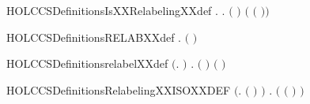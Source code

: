 \newcommand{\HOLCCSDefinitionsISXXPROCXXdef}{\UseVerbatim{HOLCCSDefinitionsISXXPROCXXdef}}
\begin{SaveVerbatim}{HOLCCSDefinitionsIsXXRelabelingXXdef}
\HOLTokenTurnstile{} \HOLSymConst{\HOLTokenForall{}}.   \HOLSymConst{\HOLTokenEquiv{}} \HOLSymConst{\HOLTokenForall{}}.  \ensuremath{(} \ensuremath{)} \HOLSymConst{\ensuremath{=}}  \ensuremath{(} \ensuremath{(} \ensuremath{)}\ensuremath{)}
\end{SaveVerbatim}
\newcommand{\HOLCCSDefinitionsIsXXRelabelingXXdef}{\UseVerbatim{HOLCCSDefinitionsIsXXRelabelingXXdef}}
\begin{SaveVerbatim}{HOLCCSDefinitionsRELABXXdef}
\HOLTokenTurnstile{} \HOLSymConst{\HOLTokenForall{}}.   \HOLSymConst{\ensuremath{=}}  \ensuremath{(} \ensuremath{)}
\end{SaveVerbatim}
\newcommand{\HOLCCSDefinitionsRELABXXdef}{\UseVerbatim{HOLCCSDefinitionsRELABXXdef}}
\begin{SaveVerbatim}{HOLCCSDefinitionsrelabelXXdef}
\HOLTokenTurnstile{} \ensuremath{(}\HOLSymConst{\HOLTokenForall{}}.   \HOLConst{\ensuremath{\tau}} \HOLSymConst{\ensuremath{=}} \HOLConst{\ensuremath{\tau}}\ensuremath{)} \HOLSymConst{\HOLTokenConj{}}
   \HOLSymConst{\HOLTokenForall{}} .   \ensuremath{(} \ensuremath{)} \HOLSymConst{\ensuremath{=}}  \ensuremath{(}  \ensuremath{)}
\end{SaveVerbatim}
\newcommand{\HOLCCSDefinitionsrelabelXXdef}{\UseVerbatim{HOLCCSDefinitionsrelabelXXdef}}
\begin{SaveVerbatim}{HOLCCSDefinitionsRelabelingXXISOXXDEF}
\HOLTokenTurnstile{} \ensuremath{(}\HOLSymConst{\HOLTokenForall{}}.  \ensuremath{(} \ensuremath{)} \HOLSymConst{\ensuremath{=}} \ensuremath{)} \HOLSymConst{\HOLTokenConj{}}
   \HOLSymConst{\HOLTokenForall{}}.
         \HOLSymConst{\HOLTokenEquiv{}}
       \ensuremath{(} \ensuremath{(} \ensuremath{)} \HOLSymConst{\ensuremath{=}} \ensuremath{)}
\end{SaveVerbatim}
